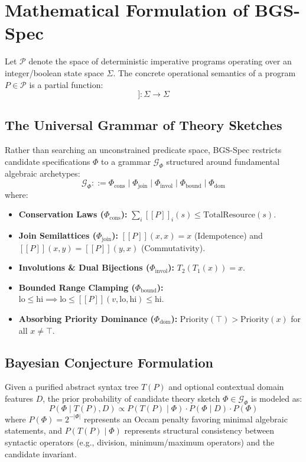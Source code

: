 \documentclass[10pt,journal,compsoc]{IEEEtran}
\newcommand{\llbracket}{[\![}
\newcommand{\rrbracket}{]\!]}
\begin{document}
\section{Mathematical Formulation of BGS-Spec}

Let $\mathcal{P}$ denote the space of deterministic imperative programs operating over an integer/boolean state space $\Sigma$. The concrete operational semantics of a program $P \in \mathcal{P}$ is a partial function:
\begin{equation}
\llbracket P \rrbracket : \Sigma \to \Sigma
\end{equation}

\subsection{The Universal Grammar of Theory Sketches}
Rather than searching an unconstrained predicate space, BGS-Spec restricts candidate specifications $\Phi$ to a grammar $\mathcal{G}_\Phi$ structured around fundamental algebraic archetypes:
\begin{equation}
\mathcal{G}_\Phi ::= \Phi_{\text{cons}} \mid \Phi_{\text{join}} \mid \Phi_{\text{invol}} \mid \Phi_{\text{bound}} \mid \Phi_{\text{dom}}
\end{equation}
where:
\begin{itemize}
    \item \textbf{Conservation Laws ($\Phi_{\text{cons}}$):} $\sum_{i} \llbracket P \rrbracket_i(s) \le \text{TotalResource}(s)$.
    \item \textbf{Join Semilattices ($\Phi_{\text{join}}$):} $\llbracket P \rrbracket(x, x) = x$ (Idempotence) and $\llbracket P \rrbracket(x, y) = \llbracket P \rrbracket(y, x)$ (Commutativity).
    \item \textbf{Involutions \& Dual Bijections ($\Phi_{\text{invol}}$):} $T_2(T_1(x)) = x$.
    \item \textbf{Bounded Range Clamping ($\Phi_{\text{bound}}$):} $\text{lo} \le \text{hi} \implies \text{lo} \le \llbracket P \rrbracket(v, \text{lo}, \text{hi}) \le \text{hi}$.
    \item \textbf{Absorbing Priority Dominance ($\Phi_{\text{dom}}$):} $\text{Priority}(\top) > \text{Priority}(x)$ for all $x \ne \top$.
\end{itemize}

\subsection{Bayesian Conjecture Formulation}
Given a purified abstract syntax tree $T(P)$ and optional contextual domain features $D$, the prior probability of candidate theory sketch $\Phi \in \mathcal{G}_\Phi$ is modeled as:
\begin{equation}
P(\Phi \mid T(P), D) \propto P(T(P) \mid \Phi) \cdot P(\Phi \mid D) \cdot P(\Phi)
\end{equation}
where $P(\Phi) = 2^{-|\Phi|}$ represents an Occam penalty favoring minimal algebraic statements, and $P(T(P) \mid \Phi)$ represents structural consistency between syntactic operators (e.g., division, minimum/maximum operators) and the candidate invariant.
\end{document}
